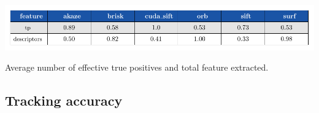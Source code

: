 \begin{table}[h]
\centerline{%
		\includegraphics[width=0.98\linewidth]{tables/descriptivness_ratio.pdf}}
    \vspace{-2mm} 
	\caption{Average number of effective true positives and total feature extracted.}
	\label{table:tp_ratio}
\end{table}

\subsection{Tracking accuracy}

